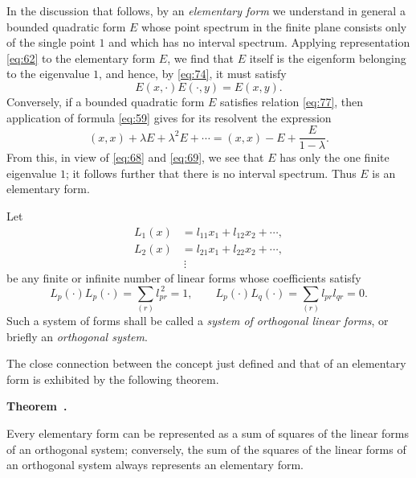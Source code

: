 \documentclass[b5paper,twoside]{article}
\makeatletter
\newcommand{\hilbertstatementname}[2]{%
  \textbf{#1\if\relax\detokenize{#2}\relax\else\ #2\fi.}%
}
\newenvironment{theorem}[1][]{%
  \par\addvspace{.7\baselineskip}%
  \phantomsection
  \protected@edef\@currentlabel{#1}%
  \noindent\hilbertstatementname{Theorem}{#1}\ \itshape\ignorespaces
}{%
  \par\addvspace{.7\baselineskip}%
}
\newcommand{\originalpage}[1]{\phantomsection\label{origpage:#1}}
\makeatother
\begin{document}
In the discussion that follows, by an \emph{elementary form} we understand in
general a bounded quadratic form $E$ whose point spectrum in the finite plane
consists only of the single point $1$ and which has no interval spectrum.
Applying representation \eqref{eq:62} to the elementary form $E$, we find
that $E$ itself is the eigenform belonging to the eigenvalue $1$, and hence,
    by \eqref{eq:74}, \originalpage{194}it must satisfy
\begin{equation}
\tag{77}\label{eq:77}
  E(x,\mathord{\cdot})E(\mathord{\cdot},y)=E(x,y).
\end{equation}
Conversely, if a bounded quadratic form $E$ satisfies relation
\eqref{eq:77}, then application of formula \eqref{eq:59} gives for its
resolvent the expression
\[
  (x,x)+\lambda E+\lambda^2E+\cdots
  =(x,x)-E+\frac{E}{1-\lambda}.
\]
From this, in view of \eqref{eq:68} and \eqref{eq:69}, we see that $E$ has
only the one finite eigenvalue $1$; it follows further that there is no
interval spectrum.  Thus $E$ is an elementary form.

Let
\[
\begin{aligned}
  L_1(x)&=l_{11}x_1+l_{12}x_2+\cdots,\\
  L_2(x)&=l_{21}x_1+l_{22}x_2+\cdots,\\
        &\ \vdots
\end{aligned}
\]
be any finite or infinite number of linear forms whose coefficients satisfy
\[
  L_p(\mathord{\cdot})L_p(\mathord{\cdot})
  =\sum_{(r)}l_{pr}^{\,2}=1,
  \qquad
  L_p(\mathord{\cdot})L_q(\mathord{\cdot})
  =\sum_{(r)}l_{pr}l_{qr}=0.
\]
Such a system of forms shall be called a \emph{system of orthogonal linear
forms}, or briefly an \emph{orthogonal system}.

The close connection between the concept just defined and that of an
elementary form is exhibited by the following theorem.

\begin{theorem}
Every elementary form can be represented as a sum of squares of the linear
forms of an orthogonal system; conversely, the sum of the squares of the
linear forms of an orthogonal system always represents an elementary form.
\end{theorem}
\end{document}
